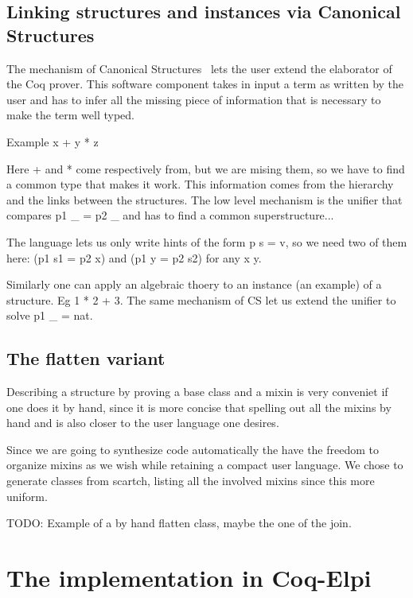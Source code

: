 \documentclass[a4paper,UKenglish,cleveref, autoref]{lipics-v2019}
\newcommand{\mixin}{mixin}
\newcommand{\mixins}{mixins}
\theoremstyle{implem}
\theoremstyle{implem}
\theoremstyle{command}
\begin{document}
\subsection{Linking structures and instances via Canonical Structures}

The mechanism of Canonical Structures~\cite{DBLP:conf/itp/MahboubiT13,Saibi99phd}
lets the user extend the elaborator of the Coq prover. This software component
takes in input a term as written by the user and has to infer all the missing
piece of information that is necessary to make the term well typed.

Example x + y * z

Here + and * come respectively from, but we are mising them, so we have
to find a common type that makes it work. This information comes from
the hierarchy and the links between the structures. The low level mechanism
is the unifier that compares p1 \_ = p2 \_ and has to find a common
superstructure...

The language lets us only write hints of the form p s = v, so we need two
of them here: (p1 s1 = p2 x) and (p1 y = p2 s2) for any x y.

Similarly one can apply an algebraic thoery to an instance (an example)
of a structure. Eg 1 * 2 + 3. The same mechanism of CS let us
extend the unifier to solve p1 \_ = nat.

\subsection{The flatten variant}

Describing a structure by proving a base class and a \mixin{} is very conveniet
if one does it by hand, since it is more concise that spelling out all the
\mixins{} by hand and is also closer to the user language one desires.

Since we are going to synthesize code automatically the have the freedom
to organize \mixins{} as we wish while retaining a compact user language.
We chose to generate classes from scartch, listing all the involved
\mixins{} since this more uniform.

TODO: Example of a by hand flatten class, maybe the one of the join.

\section{The implementation in Coq-Elpi}\label{sec:implementation}
\end{document}
